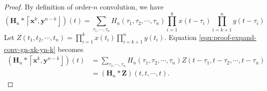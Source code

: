 \documentclass[twoside,11pt]{article}
\def\tvar#1{\mathbf{#1}} %
\def\lcerfl#1{\left\lceil{#1}\right\rfloor}
\begin{document}
\begin{proof}
  By definition of order-\(n\) convolution, we have
  \begin{equation}
    \left( \tvar{H}_n * \lcerfl{\tvar{x}^k, \tvar{y}^{n-k}} \right) (t)
    = \sum_{\tau_1, \cdots, \tau_n} H_n(\tau_1, \tau_2, \cdots, \tau_n)
    \prod_{i=1}^{k} x(t - \tau_i)
    \prod_{i=k+1}^{n} y(t - \tau_i)
    \label{equ:proof-expand-conv-gn-xk-yn-k}
  \end{equation}
  Let \(Z(t_1, t_2, \cdots, t_n) = \prod_{i=1}^{k} x(t_i) \prod_{i=k+1}^{n} y(t_i)\). Equation \ref{equ:proof-expand-conv-gn-xk-yn-k} becomes
  \begin{equation*}
    \begin{aligned}
      \left( \tvar{H}_n * \lcerfl{\tvar{x}^k, \tvar{y}^{n-k}} \right)(t)
       & = \sum_{\tau_1, \cdots, \tau_n} H_n(\tau_1, \tau_2, \cdots, \tau_n)
      Z(t - \tau_1, t - \tau_2, \cdots, t - \tau_n)
      \\
       & = \left(\tvar{H}_n * \tvar{Z}\right)(t, t, \cdots, t).
    \end{aligned}
  \end{equation*}


\end{proof}
\end{document}
